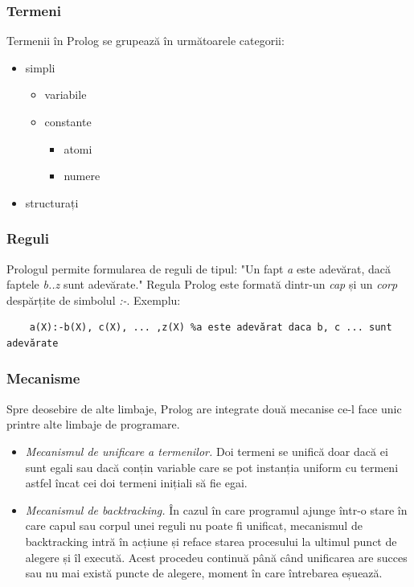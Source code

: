 \documentclass[12pt,a4paper,twoside]{report}
\begin{document}
\subsubsection{Termeni}
Termenii în Prolog se grupează în următoarele categorii:
\begin{itemize}
\item simpli
	 \begin{itemize}
	  \item variabile
	  \item constante
	  	\begin{itemize}
		\item atomi
		\item numere
		\end{itemize}
	 \end{itemize}
\item structurați
\end{itemize}
\subsubsection{Reguli}
Prologul permite formularea de reguli de tipul: "Un fapt \textit{a} este adevărat, dacă faptele \textit{b..z} sunt adevărate." Regula Prolog este formată dintr-un \textit{cap} și un \textit{corp} despărțite de simbolul \textit{:-}. Exemplu:
\begin{verbatim}
	a(X):-b(X), c(X), ... ,z(X) %a este adevărat daca b, c ... sunt adevărate 
\end{verbatim}
\subsubsection{Mecanisme}
Spre deosebire de alte limbaje, Prolog are integrate două mecanise ce-l face unic printre alte limbaje de programare.	
\begin{itemize}
\item \textit{Mecanismul de unificare a termenilor.} Doi termeni se unifică doar dacă ei sunt egali sau dacă conțin variable care se pot instanția uniform cu termeni astfel încat cei doi termeni inițiali să fie egai.
\item \textit{Mecanismul de backtracking.} În cazul în care programul ajunge într-o stare în care capul sau corpul unei reguli nu poate fi unificat, mecanismul de backtracking intră în acțiune și reface starea procesului la ultimul punct de alegere și îl execută. Acest procedeu continuă până când unificarea are succes sau nu mai există puncte de alegere, moment în care întrebarea eșuează.
\end{itemize}
\end{document}
